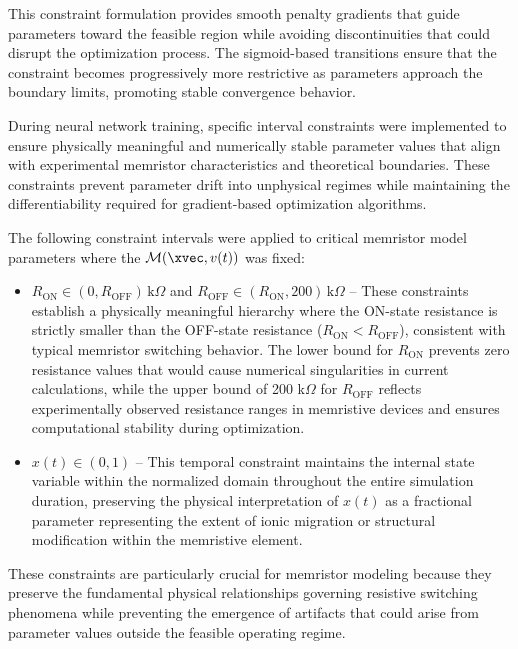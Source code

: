 \documentclass[11pt, oneside]{article}
\newcommand{\M}{\mathcal{M}}
\begin{document}
This constraint formulation provides smooth penalty gradients that guide parameters toward the feasible region while avoiding discontinuities that could disrupt the optimization process. The sigmoid-based transitions ensure that the constraint becomes progressively more restrictive as parameters approach the boundary limits, promoting stable convergence behavior.


During neural network training, specific interval constraints were implemented to ensure physically meaningful and numerically stable parameter values that align with experimental memristor characteristics and theoretical boundaries. These constraints prevent parameter drift into unphysical regimes while maintaining the differentiability required for gradient-based optimization algorithms.

The following constraint intervals were applied to critical memristor model parameters where the \(\M(\xvec, v(t))\) was fixed:

\begin{itemize}
    \item \(R_{\mathrm{ON}} \in (0, R_{\mathrm{OFF}})\,\mathrm{k}\Omega\) and \(R_{\mathrm{OFF}} \in (R_{\mathrm{ON}}, 200)\,\mathrm{k}\Omega\) – These constraints establish a physically meaningful hierarchy where the ON-state resistance is strictly smaller than the OFF-state resistance (\(R_{\mathrm{ON}} < R_{\mathrm{OFF}}\)), consistent with typical memristor switching behavior. The lower bound for \(R_{\mathrm{ON}}\) prevents zero resistance values that would cause numerical singularities in current calculations, while the upper bound of 200 k\(\Omega\) for \(R_{\mathrm{OFF}}\) reflects experimentally observed resistance ranges in memristive devices and ensures computational stability during optimization.


    \item \(x(t) \in (0, 1)\) – This temporal constraint maintains the internal state variable within the normalized domain throughout the entire simulation duration, preserving the physical interpretation of \(x(t)\) as a fractional parameter representing the extent of ionic migration or structural modification within the memristive element.
\end{itemize}

These constraints are particularly crucial for memristor modeling because they preserve the fundamental physical relationships governing resistive switching phenomena while preventing the emergence of artifacts that could arise from parameter values outside the feasible operating regime.
\end{document}
